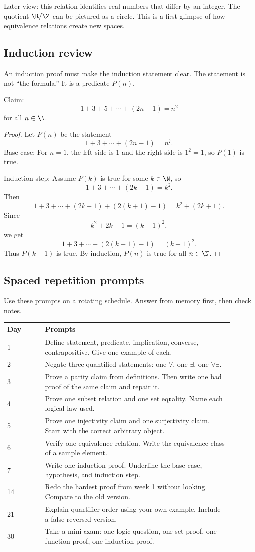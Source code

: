 Later view: this relation identifies real numbers that differ by an integer. The quotient $\R/\Z$ can be pictured as a circle. This is a first glimpse of how equivalence relations create new spaces.

\subsection{Induction review}

An induction proof must make the induction statement clear. The statement is not ``the formula.'' It is a predicate $P(n)$.

Claim:
\[
1+3+5+\cdots+(2n-1)=n^2
\]
for all $n\in\N$.

\begin{proof}
Let $P(n)$ be the statement
\[
1+3+\cdots+(2n-1)=n^2.
\]
Base case: For $n=1$, the left side is $1$ and the right side is $1^2=1$, so $P(1)$ is true.

Induction step: Assume $P(k)$ is true for some $k\in\N$, so
\[
1+3+\cdots+(2k-1)=k^2.
\]
Then
\[
1+3+\cdots+(2k-1)+(2(k+1)-1)=k^2+(2k+1).
\]
Since
\[
k^2+2k+1=(k+1)^2,
\]
we get
\[
1+3+\cdots+(2(k+1)-1)=(k+1)^2.
\]
Thus $P(k+1)$ is true. By induction, $P(n)$ is true for all $n\in\N$.
\end{proof}

\subsection{Spaced repetition prompts}

Use these prompts on a rotating schedule. Answer from memory first, then check notes.

\begin{longtable}{p{0.15\linewidth}p{0.75\linewidth}}
\toprule
Day & Prompts \\
\midrule
1 & Define statement, predicate, implication, converse, contrapositive. Give one example of each. \\
2 & Negate three quantified statements: one $\forall$, one $\exists$, one $\forall\exists$. \\
3 & Prove a parity claim from definitions. Then write one bad proof of the same claim and repair it. \\
4 & Prove one subset relation and one set equality. Name each logical law used. \\
5 & Prove one injectivity claim and one surjectivity claim. Start with the correct arbitrary object. \\
6 & Verify one equivalence relation. Write the equivalence class of a sample element. \\
7 & Write one induction proof. Underline the base case, hypothesis, and induction step. \\
14 & Redo the hardest proof from week 1 without looking. Compare to the old version. \\
21 & Explain quantifier order using your own example. Include a false reversed version. \\
30 & Take a mini-exam: one logic question, one set proof, one function proof, one induction proof. \\
\bottomrule
\end{longtable}

